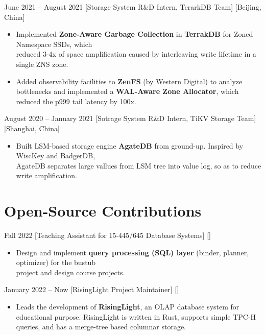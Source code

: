 \documentclass{chicv}
\begin{document}
  {June 2021 – August 2021}
  [Storage System R\&D Intern, TerarkDB Team]
  [Beijing, China]

\begin{itemize}
  \item Implemented \textbf{Zone-Aware Garbage Collection} in \textbf{TerrakDB} for Zoned Namespace SSDs, which\\ reduced 3-4x of space amplification caused by interleaving write lifetime in a single ZNS zone.
  \item Added observability facilities to \textbf{ZenFS} (by Western Digital) to analyze bottlenecks and implemented a \textbf{WAL-Aware Zone Allocator}, which reduced the p999 tail latency by 100x.
\end{itemize}

  {August 2020 -- January 2021}
  [Sotrage System R\&D Intern, TiKV Storage Team][Shanghai, China]
  \begin{itemize}
    \item Built LSM-based storage engine \textbf{AgateDB} from ground-up. Inspired by WiscKey and BadgerDB, \\AgateDB separates large vallues from LSM tree into value log, so as to reduce write amplification.
  \end{itemize}

\section{Open-Source Contributions}

  {Fall 2022}
  [Teaching Assistant for 15-445/645 Database Systems]
  []
  \begin{itemize}
    \item Design and implement \textbf{query processing (SQL) layer} (binder, planner, optimizer) for the bustub\\ project and design course projects.
  \end{itemize}

  {January 2022 -- Now}
  [RisingLight Project Maintainer]
  []
  \begin{itemize}
    \item Leads the development of \textbf{RisingLight}, an OLAP database system for educational purpose. RisingLight is written in Rust, supports simple TPC-H queries, and has a merge-tree based columnar storage.
  \end{itemize}
\end{document}
